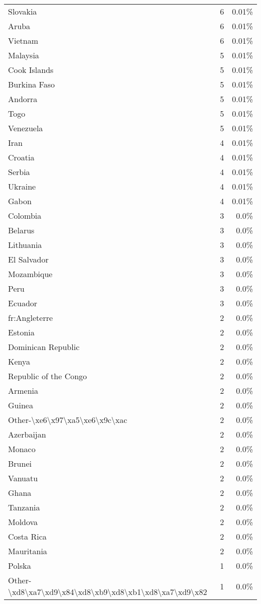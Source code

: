 \documentclass[11pt]{article}
\begin{document}
\begin{center}
\begin{longtable}{|l|c|r|}
Slovakia& 6& 0.01\%\\
Aruba& 6& 0.01\%\\
Vietnam& 6& 0.01\%\\
Malaysia& 5& 0.01\%\\
Cook Islands& 5& 0.01\%\\
Burkina Faso& 5& 0.01\%\\
Andorra& 5& 0.01\%\\
Togo& 5& 0.01\%\\
Venezuela& 5& 0.01\%\\
Iran& 4& 0.01\%\\
Croatia& 4& 0.01\%\\
Serbia& 4& 0.01\%\\
Ukraine& 4& 0.01\%\\
Gabon& 4& 0.01\%\\
Colombia& 3& 0.0\%\\
Belarus& 3& 0.0\%\\
Lithuania& 3& 0.0\%\\
El Salvador& 3& 0.0\%\\
Mozambique& 3& 0.0\%\\
Peru& 3& 0.0\%\\
Ecuador& 3& 0.0\%\\
fr:Angleterre& 2& 0.0\%\\
Estonia& 2& 0.0\%\\
Dominican Republic& 2& 0.0\%\\
Kenya& 2& 0.0\%\\
Republic of the Congo& 2& 0.0\%\\
Armenia& 2& 0.0\%\\
Guinea& 2& 0.0\%\\
Other-\textbackslash xe6\textbackslash x97\textbackslash xa5\textbackslash xe6\textbackslash x9c\textbackslash xac& 2& 0.0\%\\
Azerbaijan& 2& 0.0\%\\
Monaco& 2& 0.0\%\\
Brunei& 2& 0.0\%\\
Vanuatu& 2& 0.0\%\\
Ghana& 2& 0.0\%\\
Tanzania& 2& 0.0\%\\
Moldova& 2& 0.0\%\\
Costa Rica& 2& 0.0\%\\
Mauritania& 2& 0.0\%\\
Polska& 1& 0.0\%\\
Other-\textbackslash xd8\textbackslash xa7\textbackslash xd9\textbackslash x84\textbackslash xd8\textbackslash xb9\textbackslash xd8\textbackslash xb1\textbackslash xd8\textbackslash xa7\textbackslash xd9\textbackslash x82& 1& 0.0\%\\

\end{longtable}
\end{center}
\end{document}
